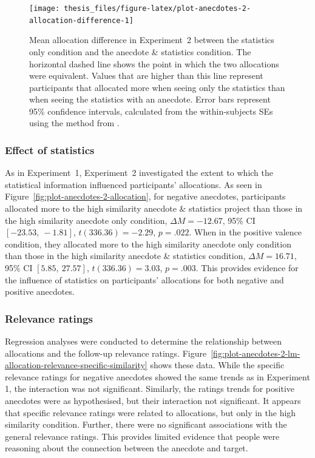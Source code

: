 \documentclass[a4paper, nobind, dvipsnames]{templates/ociamthesis}
\theoremstyle{definition}
\theoremstyle{definition}
\theoremstyle{definition}
\theoremstyle{definition}
\theoremstyle{remark}
\begin{document}
\begin{figure}
\texttt{[image: thesis\_files/figure-latex/plot-anecdotes-2-allocation-difference-1]} \caption{Mean allocation difference in Experiment~2 between the statistics only condition and the anecdote \& statistics condition. The horizontal dashed line shows the point in which the two allocations were equivalent. Values that are higher than this line represent participants that allocated more when seeing only the statistics than when seeing the statistics with an anecdote. Error bars represent 95\% confidence intervals, calculated from the within-subjects SEs using the method from \textcite{cousineau2014}.}\label{fig:plot-anecdotes-2-allocation-difference}
\end{figure}

\subsubsection{Effect of statistics}

As in Experiment~1, Experiment~2 investigated the extent to which the
statistical information influenced participants' allocations. As seen in
Figure~\ref{fig:plot-anecdotes-2-allocation}, for negative anecdotes,
participants allocated more to the high similarity anecdote \& statistics project
than those in the high similarity anecdote only condition,
\(\Delta M = -12.67\), 95\% CI \([-23.53,~-1.81]\), \(t(336.36) = -2.29\), \(p = .022\).
When in the positive valence condition, they allocated more to the high
similarity anecdote only condition than those in the high similarity anecdote \&
statistics condition,
\(\Delta M = 16.71\), 95\% CI \([5.85,~27.57]\), \(t(336.36) = 3.03\), \(p = .003\).
This provides evidence for the influence of statistics on participants'
allocations for both negative and positive anecdotes.

\subsubsection{Relevance ratings}

Regression analyses were conducted to determine the relationship between
allocations and the follow-up relevance ratings.
Figure~\ref{fig:plot-anecdotes-2-lm-allocation-relevance-specific-similarity}
shows these data. While the specific relevance ratings for negative anecdotes
showed the same trends as in Experiment 1, the interaction was not significant.
Similarly, the ratings trends for positive anecdotes were as hypothesised, but
their interaction not significant. It appears that specific relevance ratings
were related to allocations, but only in the high similarity condition. Further,
there were no significant associations with the general relevance ratings. This
provides limited evidence that people were reasoning about the connection
between the anecdote and target.
\end{document}
